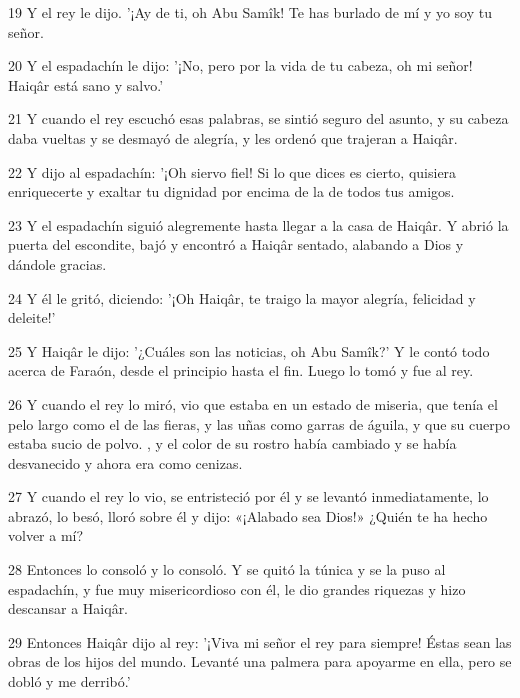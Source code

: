 \par 19 Y el rey le dijo. '¡Ay de ti, oh Abu Samîk! Te has burlado de mí y yo soy tu señor.

\par 20 Y el espadachín le dijo: '¡No, pero por la vida de tu cabeza, oh mi señor! Haiqâr está sano y salvo.'

\par 21 Y cuando el rey escuchó esas palabras, se sintió seguro del asunto, y su cabeza daba vueltas y se desmayó de alegría, y les ordenó que trajeran a Haiqâr.

\par 22 Y dijo al espadachín: '¡Oh siervo fiel! Si lo que dices es cierto, quisiera enriquecerte y exaltar tu dignidad por encima de la de todos tus amigos.

\par 23 Y el espadachín siguió alegremente hasta llegar a la casa de Haiqâr. Y abrió la puerta del escondite, bajó y encontró a Haiqâr sentado, alabando a Dios y dándole gracias.

\par 24 Y él le gritó, diciendo: '¡Oh Haiqâr, te traigo la mayor alegría, felicidad y deleite!'

\par 25 Y Haiqâr le dijo: '¿Cuáles son las noticias, oh Abu Samîk?' Y le contó todo acerca de Faraón, desde el principio hasta el fin. Luego lo tomó y fue al rey.

\par 26 Y cuando el rey lo miró, vio que estaba en un estado de miseria, que tenía el pelo largo como el de las fieras, y las uñas como garras de águila, y que su cuerpo estaba sucio de polvo. , y el color de su rostro había cambiado y se había desvanecido y ahora era como cenizas.

\par 27 Y cuando el rey lo vio, se entristeció por él y se levantó inmediatamente, lo abrazó, lo besó, lloró sobre él y dijo: «¡Alabado sea Dios!» ¿Quién te ha hecho volver a mí?

\par 28 Entonces lo consoló y lo consoló. Y se quitó la túnica y se la puso al espadachín, y fue muy misericordioso con él, le dio grandes riquezas y hizo descansar a Haiqâr.

\par 29 Entonces Haiqâr dijo al rey: '¡Viva mi señor el rey para siempre! Éstas sean las obras de los hijos del mundo. Levanté una palmera para apoyarme en ella, pero se dobló y me derribó.'


